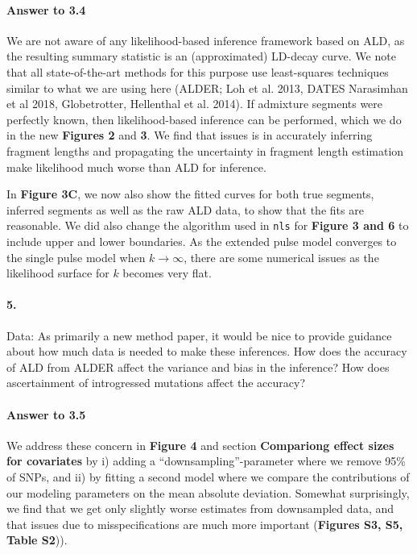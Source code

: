 \documentclass[11pt]{article}
\let\oldparagraph\paragraph
\renewcommand{\paragraph}[1]{\oldparagraph{#1}\mbox{}}
\begin{document}
\paragraph{Answer to 3.4}
We are not aware of any likelihood-based inference framework based on ALD, as the resulting summary statistic is an (approximated) LD-decay curve. We note that all state-of-the-art methods for this purpose use least-squares techniques similar to what we are using here (ALDER; Loh et al. 2013, DATES Narasimhan et al 2018, Globetrotter, Hellenthal et al. 2014). If admixture segments were perfectly known, then likelihood-based inference can be performed, which we do in the new \textbf{Figures 2} and \textbf{3}. We find that issues is in accurately inferring fragment lengths and propagating the uncertainty in fragment length estimation make likelihood much worse than ALD for inference.

In \textbf{Figure 3C}, we now also show the fitted curves for both true segments, inferred segments as well as the raw ALD data, to show that the fits are reasonable. We did also change the algorithm used in \texttt{nls} for \textbf{Figure 3 and 6} to include upper and lower boundaries. As the extended pulse model converges to the single pulse model when $k \to \infty$, there are some numerical issues as the likelihood surface for $k$ becomes very flat.

\paragraph{5.} 
Data: As primarily a new method paper, it would be nice to provide guidance about how much data is needed to make these inferences. 
How does the accuracy of ALD from ALDER affect the variance and bias in the inference? 
How does ascertainment of introgressed mutations affect the accuracy? 

\paragraph{Answer to 3.5}
We address these concern in \textbf{Figure 4} and section \textbf{Compariong effect sizes for covariates} by i) adding a ``downsampling''-parameter where we remove 95\% of SNPs, and ii) by fitting a second model where we compare the contributions of our modeling parameters on the mean absolute deviation. Somewhat surprisingly, we find that we get only slightly worse estimates from downsampled data, and that issues due to misspecifications are much more important (\textbf{Figures S3, S5, Table S2})). 
\end{document}

